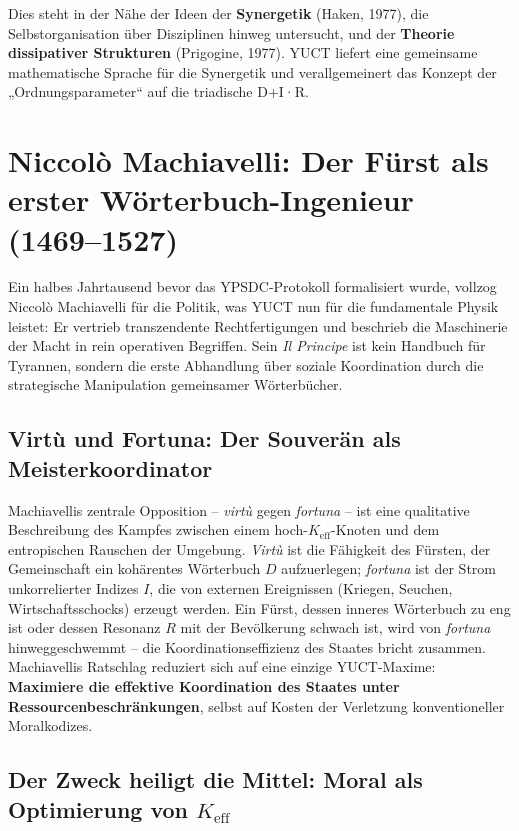 \documentclass[12pt,a4paper]{article}
\newcommand{\Keff}{K_{\mathrm{eff}}}
\begin{document}
	Dies steht in der Nähe der Ideen der \textbf{Synergetik} (Haken, 1977), die Selbstorganisation über Disziplinen hinweg untersucht, und der \textbf{Theorie dissipativer Strukturen} (Prigogine, 1977). YUCT liefert eine gemeinsame mathematische Sprache für die Synergetik und verallgemeinert das Konzept der „Ordnungsparameter“ auf die triadische D+I·R.
	
	\section{Niccolò Machiavelli: Der Fürst als erster Wörterbuch-Ingenieur (1469–1527)}
	\label{sec:machiavelli}
	
	Ein halbes Jahrtausend bevor das YPSDC-Protokoll formalisiert wurde, vollzog Niccolò Machiavelli für die Politik, was YUCT nun für die fundamentale Physik leistet: Er vertrieb transzendente Rechtfertigungen und beschrieb die Maschinerie der Macht in rein operativen Begriffen. Sein \emph{Il Principe} ist kein Handbuch für Tyrannen, sondern die erste Abhandlung über soziale Koordination durch die strategische Manipulation gemeinsamer Wörterbücher.
	
	\subsection{Virtù und Fortuna: Der Souverän als Meisterkoordinator}
	
	Machiavellis zentrale Opposition – \emph{virtù} gegen \emph{fortuna} – ist eine qualitative Beschreibung des Kampfes zwischen einem hoch-\(\Keff\)-Knoten und dem entropischen Rauschen der Umgebung. \emph{Virtù} ist die Fähigkeit des Fürsten, der Gemeinschaft ein kohärentes Wörterbuch \(D\) aufzuerlegen; \emph{fortuna} ist der Strom unkorrelierter Indizes \(I\), die von externen Ereignissen (Kriegen, Seuchen, Wirtschaftsschocks) erzeugt werden. Ein Fürst, dessen inneres Wörterbuch zu eng ist oder dessen Resonanz \(R\) mit der Bevölkerung schwach ist, wird von \emph{fortuna} hinweggeschwemmt – die Koordinationseffizienz des Staates bricht zusammen. Machiavellis Ratschlag reduziert sich auf eine einzige YUCT-Maxime: \textbf{Maximiere die effektive Koordination des Staates unter Ressourcenbeschränkungen}, selbst auf Kosten der Verletzung konventioneller Moralkodizes.
	
	\subsection{Der Zweck heiligt die Mittel: Moral als Optimierung von \(K_{\mathrm{eff}}\)}
	
\end{document}
